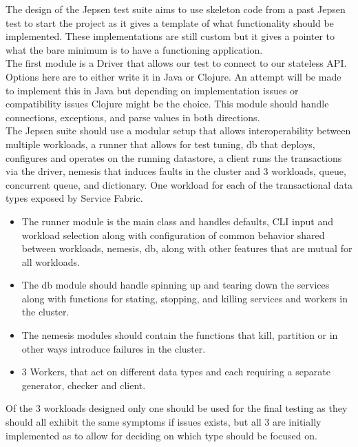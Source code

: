 \documentclass[a4paper,10pt,titlepage]{report}
\begin{document}
    The design of the Jepsen test suite aims to use skeleton code from a past Jepsen test to start the project as it gives a template of what functionality should be implemented. These implementations are still custom but it gives a pointer to what the bare minimum is to have a functioning application.
    \\
    The first module is a Driver that allows our test to connect to our stateless API. Options here are to either write it in Java or Clojure. An attempt will be made to implement this in Java but depending on implementation issues or compatibility issues Clojure might be the choice. This module should handle connections, exceptions, and parse values in both directions.
    \\
    The Jepsen suite should use a modular setup that allows interoperability between multiple workloads, a runner that allows for test tuning, db that deploys, configures and operates on the running datastore, a client runs the transactions via the driver, nemesis that induces faults in the cluster and 3 workloads, queue, concurrent queue, and dictionary. One workload for each of the transactional data types exposed by Service Fabric.
    \begin{itemize}
        \item The runner module is the main class and handles defaults, CLI input and workload selection along with configuration of common behavior shared between workloads, nemesis, db, along with other features that are mutual for all workloads.
        \item   The db module should handle spinning up and tearing down the services along with functions for stating, stopping, and killing services and workers in the cluster.

  \item  The nemesis modules should contain the functions that kill, partition or in other ways introduce failures in the cluster.

  \item 3 Workers, that act on different data types and each requiring a separate generator, checker and client.
    \end{itemize}
    
    Of the 3 workloads designed only one should be used for the final testing as they should all exhibit the same symptoms if issues exists, but all 3 are initially implemented as to allow for deciding on which type should be focused on.
    
\end{document}
